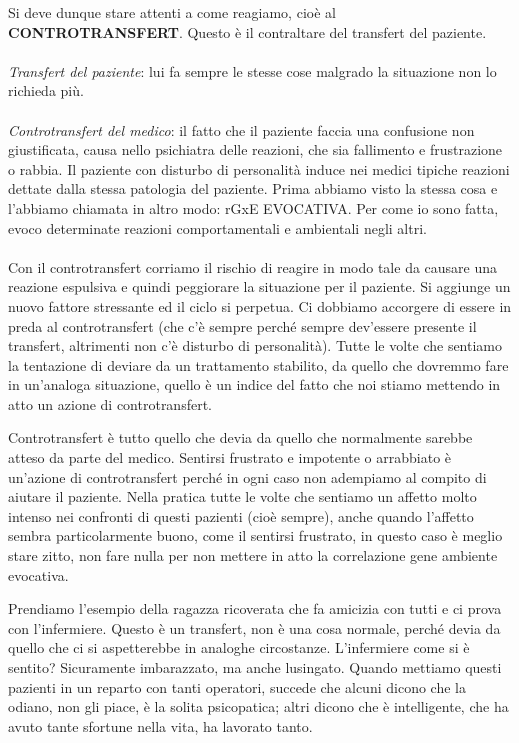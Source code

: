 Si deve dunque stare attenti a come reagiamo, cioè al
\textbf{CONTROTRANSFERT}. Questo è il contraltare del transfert del
paziente.
\\\\
\emph{Transfert del paziente}: lui fa sempre le stesse cose malgrado la
situazione non lo richieda più.
\\\\
\emph{Controtransfert del medico}: il fatto che il paziente faccia una
confusione non giustificata, causa nello psichiatra delle reazioni, che
sia fallimento e frustrazione o rabbia. Il paziente con disturbo di
personalità induce nei medici tipiche reazioni dettate dalla stessa
patologia del paziente. Prima abbiamo visto la stessa cosa e l'abbiamo
chiamata in altro modo: rGxE EVOCATIVA. Per come io sono fatta, evoco
determinate reazioni comportamentali e ambientali negli altri.
\\\\
Con il controtransfert corriamo il rischio di reagire in modo tale da
causare una reazione espulsiva e quindi peggiorare la situazione per il
paziente. Si aggiunge un nuovo fattore stressante ed il ciclo si
perpetua. Ci dobbiamo accorgere di essere in preda al controtransfert
(che c'è sempre perché sempre dev'essere presente il transfert,
altrimenti non c'è disturbo di personalità). Tutte le volte che sentiamo
la tentazione di deviare da un trattamento stabilito, da quello che
dovremmo fare in un'analoga situazione, quello è un indice del fatto che
noi stiamo mettendo in atto un azione di controtransfert.

Controtransfert è tutto quello che devia da quello che normalmente
sarebbe atteso da parte del medico. Sentirsi frustrato e impotente o
arrabbiato è un'azione di controtransfert perché in ogni caso non
adempiamo al compito di aiutare il paziente. Nella pratica tutte le
volte che sentiamo un affetto molto intenso nei confronti di questi
pazienti (cioè sempre), anche quando l'affetto sembra particolarmente
buono, come il sentirsi frustrato, in questo caso è meglio stare zitto,
non fare nulla per non mettere in atto la correlazione gene ambiente
evocativa.

Prendiamo l'esempio della ragazza ricoverata che fa amicizia con tutti e
ci prova con l'infermiere. Questo è un transfert, non è una cosa
normale, perché devia da quello che ci si aspetterebbe in analoghe
circostanze. L'infermiere come si è sentito? Sicuramente imbarazzato, ma
anche lusingato. Quando mettiamo questi pazienti in un reparto con tanti
operatori, succede che alcuni dicono che la odiano, non gli piace, è la
solita psicopatica; altri dicono che è intelligente, che ha avuto tante
sfortune nella vita, ha lavorato tanto.

